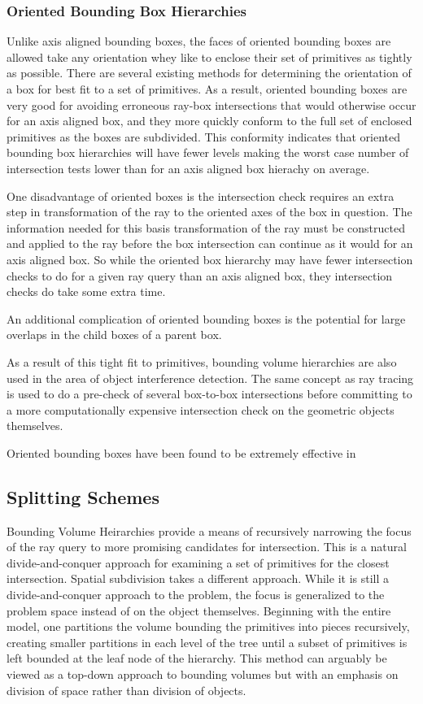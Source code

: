 \documentclass[10pt, a4paper]{article}
\begin{document}
\subsubsection{Oriented Bounding Box Hierarchies}

Unlike axis aligned bounding boxes, the faces of oriented bounding boxes are allowed take any orientation whey like to enclose their set of primitives as tightly as possible. There are several existing methods for determining the orientation of a box for best fit to a set of primitives.\cite{gottschalk1996obbtree} As a result, oriented bounding boxes are very good for avoiding erroneous ray-box intersections that would otherwise occur for an axis aligned box, and they more quickly conform to the full set of enclosed primitives as the boxes are subdivided. This conformity indicates that oriented bounding box hierarchies will have fewer levels making the worst case number of intersection tests lower than for an axis aligned box hierachy on average.

One disadvantage of oriented boxes is the intersection check requires an extra step in transformation of the ray to the oriented axes of the box in question. The information needed for this basis transformation of the ray must be constructed and applied to the ray before the box intersection can continue as it would for an axis aligned box. So while the oriented box hierarchy may have fewer intersection checks to do for a given ray query than an axis aligned box, they intersection checks do take some extra time.

An additional complication of oriented bounding boxes is the potential for large overlaps in the child boxes of a parent box. 

As a result of this tight fit to primitives, bounding volume hierarchies are also used in the area of object interference detection. The same concept as ray tracing is used to do a pre-check of several box-to-box intersections before committing to a more computationally expensive intersection check on the geometric objects themselves.

Oriented bounding boxes have been found to be extremely effective in 


\subsection{Splitting Schemes}

Bounding Volume Heirarchies provide a means of recursively narrowing the focus of the ray query to more promising candidates for intersection. This is a natural divide-and-conquer approach for examining a set of primitives for the closest intersection. Spatial subdivision takes a different approach. \cite{Intro2RT} While it is still a divide-and-conquer approach to the problem, the focus is generalized to the problem space instead of on the object themselves. Beginning with the entire model, one partitions the volume bounding the primitives into pieces recursively, creating smaller partitions in each level of the tree until a subset of primitives is left bounded at the leaf node of the hierarchy. This method can arguably be viewed as a top-down approach to bounding volumes but with an emphasis on division of space rather than division of objects.
\end{document}
